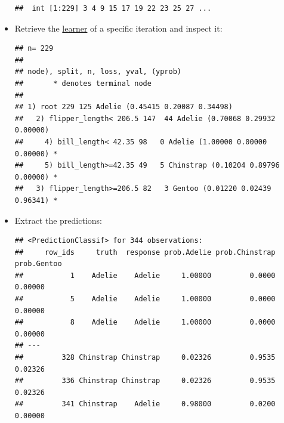 \documentclass[
]{scrbook}
\newenvironment{Shaded}{\begin{snugshade}}{\end{snugshade}}
\newcommand{\CommentTok}[1]{\textcolor[rgb]{0.56,0.35,0.01}{\textit{#1}}}
\newcommand{\DecValTok}[1]{\textcolor[rgb]{0.00,0.00,0.81}{#1}}
\newcommand{\FunctionTok}[1]{\textcolor[rgb]{0.00,0.00,0.00}{#1}}
\newcommand{\NormalTok}[1]{#1}
\newcommand{\OtherTok}[1]{\textcolor[rgb]{0.56,0.35,0.01}{#1}}
\newcommand{\SpecialCharTok}[1]{\textcolor[rgb]{0.00,0.00,0.00}{#1}}
\renewenvironment{Shaded} {\begin{snugshade}\small} {\end{snugshade}}
\begin{document}
\begin{itemize}
\begin{verbatim}
##  int [1:229] 3 4 9 15 17 19 22 23 25 27 ...
\end{verbatim}
\item
  Retrieve the \protect\hyperlink{learners}{learner} of a specific iteration and inspect it:

\begin{Shaded}
\end{Shaded}

\begin{verbatim}
## n= 229 
## 
## node), split, n, loss, yval, (yprob)
##       * denotes terminal node
## 
## 1) root 229 125 Adelie (0.45415 0.20087 0.34498)  
##   2) flipper_length< 206.5 147  44 Adelie (0.70068 0.29932 0.00000)  
##     4) bill_length< 42.35 98   0 Adelie (1.00000 0.00000 0.00000) *
##     5) bill_length>=42.35 49   5 Chinstrap (0.10204 0.89796 0.00000) *
##   3) flipper_length>=206.5 82   3 Gentoo (0.01220 0.02439 0.96341) *
\end{verbatim}
\item
  Extract the predictions:

\begin{Shaded}
\end{Shaded}

\begin{verbatim}
## <PredictionClassif> for 344 observations:
##     row_ids     truth  response prob.Adelie prob.Chinstrap prob.Gentoo
##           1    Adelie    Adelie     1.00000         0.0000     0.00000
##           5    Adelie    Adelie     1.00000         0.0000     0.00000
##           8    Adelie    Adelie     1.00000         0.0000     0.00000
## ---                                                                   
##         328 Chinstrap Chinstrap     0.02326         0.9535     0.02326
##         336 Chinstrap Chinstrap     0.02326         0.9535     0.02326
##         341 Chinstrap    Adelie     0.98000         0.0200     0.00000
\end{verbatim}


\end{itemize}
\end{document}

